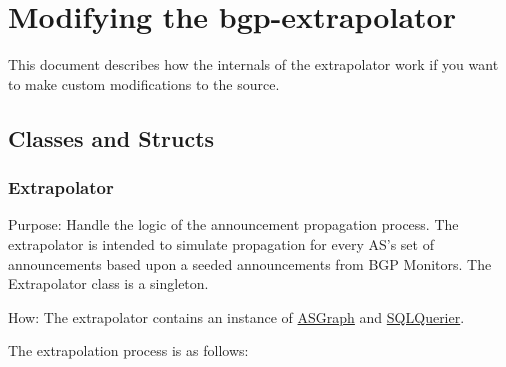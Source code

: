 \documentclass[letterpaper]{article}
\date{}
\begin{document}
\flushbottom
\thispagestyle{empty}



\hypertarget{modifying-the-bgp-extrapolator}{%
\section{Modifying the bgp-extrapolator}
\label{modifying-the-bgp-extrapolator}}

This document describes how the internals of the extrapolator work if
you want to make custom modifications to the source.

\hypertarget{classes-and-structs}{%
\subsection{Classes and Structs}\label{classes-and-structs}}

\hypertarget{extrapolator}{%
\subsubsection{Extrapolator}\label{extrapolator}}

Purpose: Handle the logic of the announcement propagation process. The
extrapolator is intended to simulate propagation for every AS's set of
announcements based upon a seeded announcements from BGP Monitors. The
Extrapolator class is a singleton.

How: The extrapolator contains an instance of
\protect\hyperlink{ASGraph}{ASGraph} and
\protect\hyperlink{SQLQuerier}{SQLQuerier}.

The extrapolation process is as follows:
\end{document}
